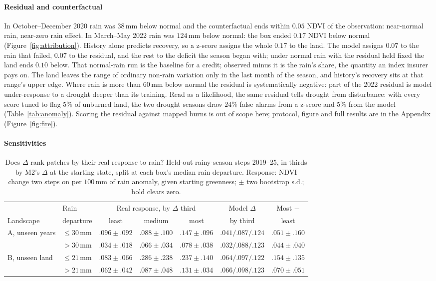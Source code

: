 \documentclass[letterpaper]{article} %
\begin{document}
\paragraph{Residual and counterfactual} In October--December 2020 rain was $38$\,mm below normal and the counterfactual ends within $0.05$ NDVI of the observation: near-normal rain, near-zero rain effect. In March--May 2022 rain was $124$\,mm below normal: the box ended $0.17$ NDVI below normal (Figure~\ref{fig:attribution}). History alone predicts recovery, so a z-score assigns the whole $0.17$ to the land. The model assigns $0.07$ to the rain that failed, $0.07$ to the residual, and the rest to the deficit the season began with; under normal rain with the residual held fixed the land ends $0.10$ below. That normal-rain run is the baseline for a credit; observed minus it is the rain's share, the quantity an index insurer pays on. The land leaves the range of ordinary non-rain variation only in the last month of the season, and history's recovery sits at that range's upper edge. Where rain is more than $60$\,mm below normal the residual is systematically negative: part of the 2022 residual is model under-response to a drought deeper than its training. Read as a likelihood, the same residual tells drought from disturbance: with every score tuned to flag $5\%$ of unburned land, the two drought seasons draw $24\%$ false alarms from a z-score and $5\%$ from the model (Table~\ref{tab:anomaly}). Scoring the residual against mapped burns is out of scope here; protocol, figure and full results are in the Appendix (Figure~\ref{fig:fire}).

\paragraph{Sensitivities}
\begin{table}[t]\centering\footnotesize\setlength{\tabcolsep}{3pt}
\caption{Does $\Delta$ rank patches by their real response to rain? Held-out rainy-season steps 2019--25, in thirds by M2's $\Delta$ at the starting state, split at each box's median rain departure. Response: NDVI change two steps on per $100$\,mm of rain anomaly, given starting greenness; $\pm$ two bootstrap s.d.; bold clears zero.}\label{tab:greeks}
\begin{tabular}{llccccc}\toprule
 & Rain & \multicolumn{3}{c}{Real response, by $\Delta$ third} & Model $\Delta$ & Most $-$\\
Landscape & departure & least & medium & most & by third & least\\\midrule
A, unseen years & $\le 30$\,mm & $.096\pm.092$ & $.088\pm.100$ & $.147\pm.096$ & $.041/.087/.124$ & $.051\pm.160$\\
 & $> 30$\,mm & $.034\pm.018$ & $.066\pm.034$ & $.078\pm.038$ & $.032/.088/.123$ & $\mathbf{.044\pm.040}$\\
B, unseen land & $\le 21$\,mm & $.083\pm.066$ & $.286\pm.238$ & $.237\pm.140$ & $.064/.097/.122$ & $\mathbf{.154\pm.135}$\\
 & $> 21$\,mm & $.062\pm.042$ & $.087\pm.048$ & $.131\pm.034$ & $.066/.098/.123$ & $\mathbf{.070\pm.051}$\\\bottomrule
\end{tabular}
\end{table}
\end{document}
